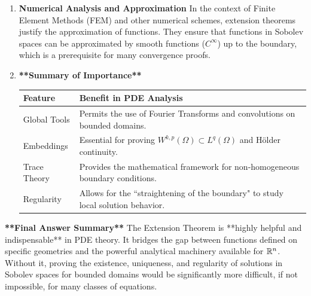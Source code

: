 \documentclass[12pt,a4paper]{report}
\begin{document}
\begin{description}
\begin{enumerate}
\item \textbf{Numerical Analysis and Approximation}
In the context of Finite Element Methods (FEM) and other numerical schemes, extension theorems justify the approximation of functions. They ensure that functions in Sobolev spaces can be approximated by smooth functions ($C^\infty$) up to the boundary, which is a prerequisite for many convergence proofs.

\item \textbf{**Summary of Importance**} 

\begin{tabular}{|p{1 in}|p{4.5 in}|}
	\hline
	Feature & Benefit in PDE Analysis \\
	\hline
	Global Tools & Permits the use of Fourier Transforms and convolutions on bounded domains. \\
	Embeddings & Essential for proving $W^{k,p}(\Omega) \subset L^q(\Omega)$ and Hölder continuity. \\
	Trace Theory & Provides the mathematical framework for non-homogeneous boundary conditions. \\
	Regularity & Allows for the ``straightening of the boundary" to study local solution behavior. \\
	\hline
\end{tabular}
\end{enumerate}

\textbf{**Final Answer Summary**}
The Extension Theorem is **highly helpful and indispensable** in PDE theory. It bridges the gap between functions defined on specific geometries and the powerful analytical machinery available for $\mathbb{R}^n$. Without it, proving the existence, uniqueness, and regularity of solutions in Sobolev spaces for bounded domains would be significantly more difficult, if not impossible, for many classes of equations.


\end{description}
\end{document}
